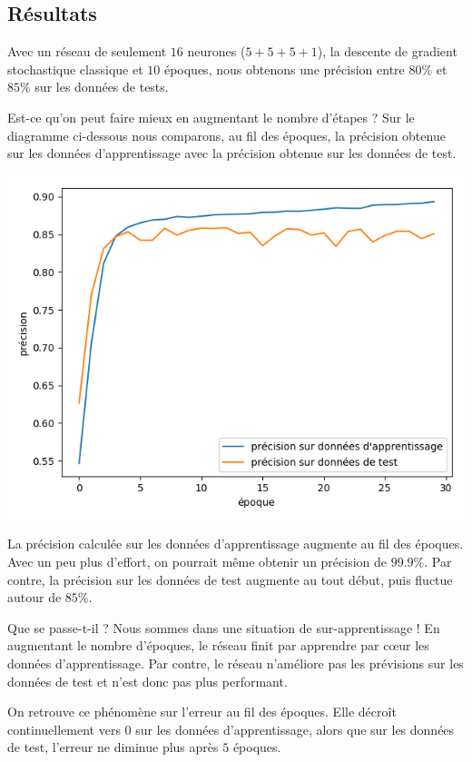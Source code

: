 \documentclass[11pt,class=report,crop=false]{standalone}
\begin{document}
\subsection{Résultats}

Avec un réseau de seulement $16$ neurones ($5+5+5+1$), la descente de gradient stochastique classique et $10$ époques, nous obtenons une précision entre $80\%$ et $85\%$ sur les données de tests.

Est-ce qu'on peut faire mieux en augmentant le nombre d'étapes ?
Sur le diagramme ci-dessous nous comparons, au fil des époques, la précision obtenue sur les données d'apprentissage avec la précision obtenue sur les données de test.

\begin{center}
\includegraphics[scale=\myscale,scale=0.5]{figures/tf2-texte-overfit-acc}
\end{center}
La précision calculée sur les données d'apprentissage augmente au fil des époques. Avec un peu plus d'effort, on pourrait même obtenir un précision de $99.9\%$. Par contre, la précision sur les données de test augmente au tout début, puis fluctue autour de $85\%$. 

Que se passe-t-il ? Nous sommes dans une situation de sur-apprentissage ! En augmentant le nombre d'époques, le réseau finit par apprendre par c\oe ur les données d'apprentissage. Par contre, le réseau n'améliore pas les prévisions sur les données de test et n'est donc pas plus performant.

On retrouve ce phénomène sur l'erreur au fil des époques. Elle décroît continuellement vers $0$ sur les données d'apprentissage, alors que sur les données de test, l'erreur ne diminue plus après $5$ époques.
\end{document}
